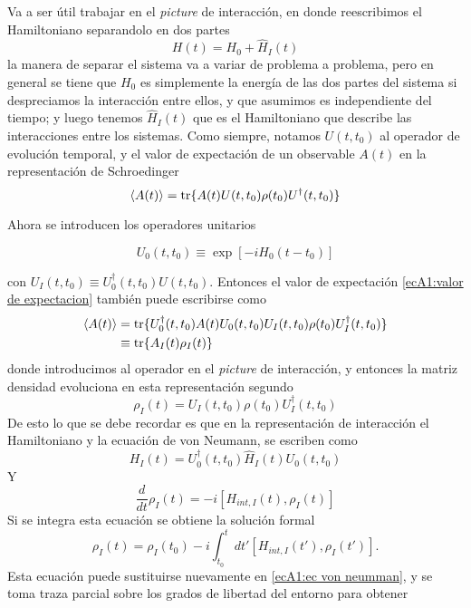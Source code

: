 Va a ser útil trabajar en el \textit{picture} de interacción, en donde reescribimos el Hamiltoniano separandolo en dos partes
\begin{equation}
    H(t)=H_0+\hat H_I(t)
\end{equation}
la manera de separar el sistema va a variar de problema a problema, pero en general se tiene que $H_0$ es simplemente la energía de las dos partes del sistema si despreciamos la interacción entre ellos, y que asumimos es independiente del tiempo; y luego tenemos $\hat H_I(t)$ que es el Hamiltoniano que describe las interacciones entre los sistemas. Como siempre, notamos $U(t,t_0)$ al operador de evolución temporal, y el valor de expectación de un observable $A(t)$ en la representación de Schroedinger
\begin{equation}
    \langle A(t) \rangle = \tr \{ A(t)U(t,t_0) \rho(t_0)U^\dagger(t,t_0) \}
    \label{ecA1:valor de expectacion}
\end{equation}

Ahora se introducen los operadores unitarios

\begin{equation}
    U_0(t,t_0)\equiv\exp [ -i H_0(t-t_0)]
\end{equation}

con $U_I(t,t_0)\equiv U_0^\dagger(t,t_0)U(t,t_0)$. Entonces el valor de expectación \ref{ecA1:valor de expectacion} también puede escribirse como
\begin{equation}
    \begin{aligned}
    \langle A(t) \rangle &= \tr \{ U_0^\dagger(t,t_0)A(t)U_0(t,t_0)U_I(t,t_0) \rho(t_0)U_I^\dagger(t,t_0) \} \\
    & \equiv \tr \{A_I(t)\rho_I(t) \}
    \end{aligned}
    \label{ecA1:valor de expectacion interaccion}
\end{equation}
donde introducimos al operador en el \textit{picture} de interacción, y entonces la matriz densidad evoluciona en esta representación segundo
\begin{equation}
    \rho_I(t)=U_I(t,t_0)\rho(t_0)U^\dagger_I(t,t_0)
\end{equation}
De esto lo que se debe recordar es que en la representación de interacción el Hamiltoniano y la ecuación de von Neumann, se escriben como
\begin{equation}
    H_I(t)=U_0^\dagger(t,t_0)\hat H_I(t)U_0(t,t_0)
\end{equation}
Y
\begin{equation}
    \frac{d}{dt}\rho_I(t)=-i[H_{int,I}(t),\rho_I(t)]
    \label{ecA1:ec von neumman}
\end{equation}
Si se integra esta ecuación se obtiene la solución formal
\begin{equation}
    \rho_I(t)=\rho_I(t_0)-i\int_{t_0}^{t}dt' [H_{int,I}(t'),\rho_I(t')].
    \label{ecA1:ec maestra integrodiferencial}
\end{equation}
Esta ecuación puede sustituirse nuevamente en \ref{ecA1:ec von neumman}, y se toma traza parcial sobre los grados de libertad del entorno para obtener

